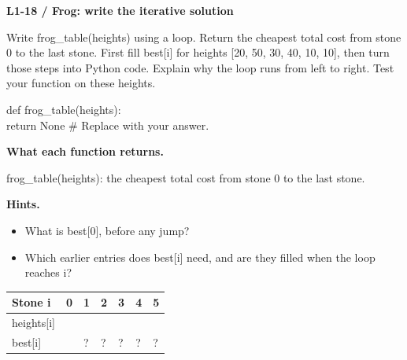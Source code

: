 \documentclass[11pt,a4paper]{article}
\begin{document}
\par\noindent\begin{minipage}{\linewidth}
\textbf{L1-18 / Frog: write the iterative solution}\par\smallskip Write frog\_table(heights) using a loop. Return the cheapest total cost from stone 0 to the last stone. First fill best[i] for heights [20, 50, 30, 40, 10, 10], then turn those steps into Python code. Explain why the loop runs from left to right. Test your function on these heights.\par
\par{}\par\smallskip\noindent\colorbox{codepaper}{\parbox{\dimexpr\linewidth-2\fboxsep\relax}{\small\ttfamily\raggedright def frog\_table(heights):\\\hspace*{2.4em}return None  \# Replace with your answer.}}\par
{\small\textbf{What each function returns.}\par frog\_table(heights): the cheapest total cost from stone 0 to the last stone.\par }
{\small\textbf{Hints.}}\begin{itemize}\item What is best[0], before any jump?\item Which earlier entries does best[i] need, and are they filled when the loop reaches i?\end{itemize}
\par\smallskip \begingroup\small\setlength{\tabcolsep}{4pt}\renewcommand{\arraystretch}{1.35}\begin{tabularx}{\linewidth}{>{\raggedright\arraybackslash}l>{\raggedright\arraybackslash}X>{\raggedright\arraybackslash}X>{\raggedright\arraybackslash}X>{\raggedright\arraybackslash}X>{\raggedright\arraybackslash}X>{\raggedright\arraybackslash}X}\toprule\textbf{Stone i} & \textbf{0} & \textbf{1} & \textbf{2} & \textbf{3} & \textbf{4} & \textbf{5}\\\midrule
heights[i] & 20 & 50 & 30 & 40 & 10 & 10\\
best[i] & 0 & ? & ? & ? & ? & ?\\
\bottomrule\end{tabularx}\endgroup\par\smallskip 
\end{minipage}\par\vspace{2mm}
\end{document}
